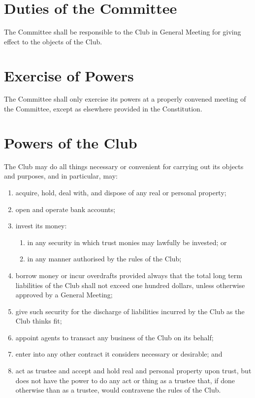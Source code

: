 \documentclass[11pt]{article} %
\begin{document}
\section{Duties of the Committee}
The Committee shall be responsible to the Club in General Meeting for giving effect to the objects of the Club.

\section{Exercise of Powers}
The Committee shall only exercise its powers at a properly convened meeting of the Committee, except as elsewhere provided in the Constitution.

\section{Powers of the Club}
The Club may do all things necessary or convenient for carrying out its objects and purposes, and in particular, may:
\begin{enumerate}
	\item acquire, hold, deal with, and dispose of any real or personal property;
	\item open and operate bank accounts;
	\item invest its money:
		\begin{enumerate}
			\item in any security in which trust monies may lawfully be invested; or
			\item in any manner authorised by the rules of the Club;
		\end{enumerate}
	\item borrow money or incur overdrafts provided always that the total long term liabilities of the Club shall not exceed one hundred dollars, unless otherwise approved by a General Meeting;
	\item give such security for the discharge of liabilities incurred by the Club as the Club thinks fit;
	\item appoint agents to transact any business of the Club on its behalf;
	\item enter into any other contract it considers necessary or desirable; and
	\item act as trustee and accept and hold real and personal property upon trust, but does not have the power to do any act or thing as a trustee that, if done otherwise than as a trustee, would contravene the rules of the Club.
\end{enumerate}
\end{document}
